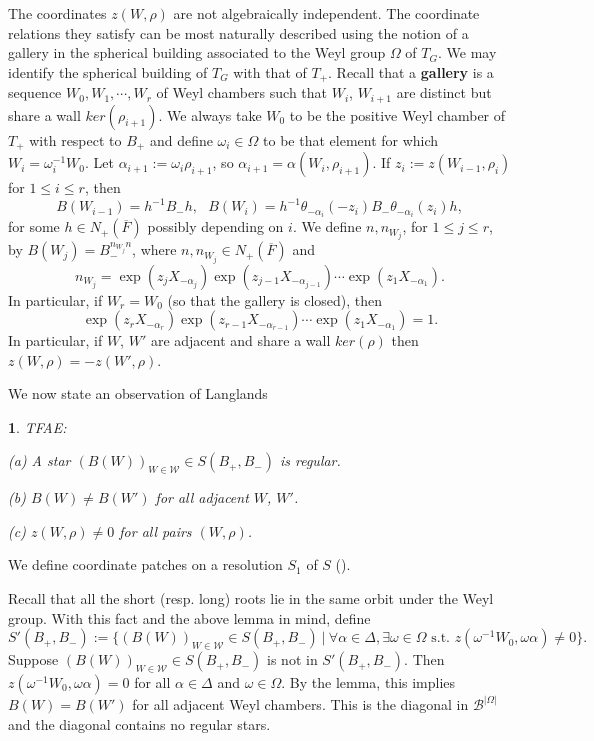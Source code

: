 \documentclass[12pt,letterpaper]{amsart}
\newcommand{\proclaimname}{}
\newtheorem*{proclaimx}{\proclaimname}
\newenvironment{proclaim}[1]%
  {\renewcommand{\proclaimname}{#1}\begin{proclaimx}}{\end{proclaimx}}
\begin{document}
The coordinates $z(W,\rho)$ are not algebraically independent.
The coordinate relations they satisfy can be most naturally
described using the notion of a gallery in the spherical building
associated to the Weyl group $\Omega$ of $T_G$. We may identify the
spherical building of $T_G$ with that of $T_+$.
Recall that a \textbf{gallery} is a sequence $W_0,W_1,\cdots, W_r$
of Weyl chambers such that $W_i$, $W_{i+1}$ are distinct but share a wall
$ker(\rho_{i+1})$. We always take $W_0$ to be the positive Weyl chamber of
$T_+$ with respect to $B_+$ and define
$\omega_i\in\Omega$ to be that element for which
$W_i=\omega_i^{-1}W_0$. Let $\alpha_{i+1}:=\omega_i\rho_{i+1}$,
so $\alpha_{i+1}=\alpha(W_i,\rho_{i+1})$. If $z_i:=z(W_{i-1},\rho_i)$
for $1\leq i\leq r$,
then
\[
B(W_{i-1})=h^{-1}B_-h,\ \ \
B(W_i)=h^{-1}\theta_{-\alpha_i}(-z_i)
B_-\theta_{-\alpha_i}(z_i)h,
\tag{1.9}
\]
for some $h\in N_+(\overline{F})$ possibly depending on $i$. We
define $n,n_{W_j}$, for $1\leq j\leq r$, by
$B(W_j)=B_-^{n_{W_j}n}$, where $n,n_{W_j}\in N_+(\overline{F})$
and
\[
n_{W_j}=\exp (z_jX_{-\alpha_j})
\exp (z_{j-1}X_{-\alpha_{j-1}})\cdots \exp (z_1X_{-\alpha_1}).
\tag{1.10}
\]
In particular, if $W_r=W_0$ (so that the gallery is closed),
then
\[
\exp (z_rX_{-\alpha_r})
\exp (z_{r-1}X_{-\alpha_{r-1}})\cdots \exp (z_1X_{-\alpha_1})=1.
\tag{1.11}
\]
In particular, if $W$, $W'$ are adjacent and share a wall
$ker(\rho)$ then $z(W,\rho)=-z(W',\rho)$.

We now state an observation of Langlands \cite[pp.483-484]{La83}

\begin{proclaim}{Lemma 1.12} TFAE:

\noindent
(a) A star $(B(W))_{W\in{\mathcal W}}\in S(B_+,B_-)$ is regular.

\noindent
(b) $B(W)\not= B(W')$ for all adjacent $W$, $W'$.

\noindent
(c) $z(W,\rho)\not= 0$ for all pairs $(W,\rho)$.
\end{proclaim}

We define coordinate patches on a resolution $S_1$ of $S$ (\cite{Ha92a}).

Recall that all the short (resp. long) roots lie in the same orbit
under the Weyl group. With this fact and the above lemma in mind, define
\[
S'(B_+,B_-):=\{(B(W))_{W\in{\mathcal W}}\in S(B_+,B_-)
\ |\ \forall \alpha\in\Delta ,\exists \omega\in\Omega
\text{ s.t. }z(\omega^{-1}W_0,\omega\alpha)\not= 0\}.
\]
Suppose $(B(W))_{W\in{\mathcal W}}\in S(B_+,B_-)$ is not in
$S'(B_+,B_-)$. Then $z(\omega^{-1}W_0,\omega\alpha)=0$
for all $\alpha\in\Delta$ and $\omega\in\Omega$. By the lemma,
this implies $B(W)=B(W')$ for all adjacent Weyl chambers. This is
the diagonal in ${\mathcal B}^{|\Omega|}$ and the diagonal contains no
regular stars.
\end{document}
